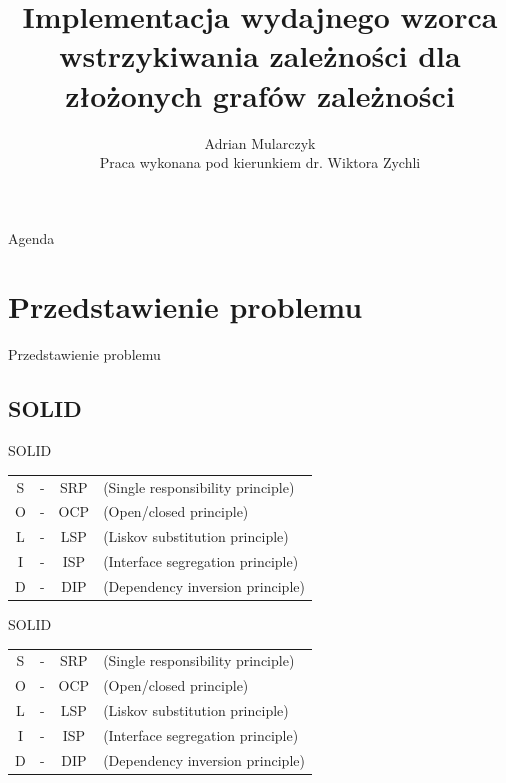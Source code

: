 \documentclass{beamer}
\title[]
{Implementacja wydajnego wzorca wstrzykiwania zależności dla złożonych grafów zależności}
\author[Adrian Mularczyk]{Adrian Mularczyk \\[10pt]{\footnotesize Praca wykonana pod kierunkiem dr. Wiktora Zychli}}
\institute[Uniwersytet Wrocławski]
{
Uniwersytet Wrocławski\\
Wydział Matematyki i Informatyki\\
Kierunek: Informatyka
}
\date{}
\begin{document}
\begin{frame}
  \titlepage 
\end{frame}

\begin{frame}{Agenda}
  \tableofcontents
\end{frame}

\section{Przedstawienie problemu}

\begin{frame}{}
\begin{center}
\huge{Przedstawienie problemu}
\end{center}
\end{frame}

\subsection*{SOLID}

\begin{frame}{SOLID}
\begin{table}
	\begin{tabular}{ c c c l }
	S &-& SRP& (Single responsibility principle)\\
	O &-& OCP& (Open/closed principle)\\
	L &-& LSP& (Liskov substitution principle)\\
	I &-& ISP& (Interface segregation principle)\\
	D &-& DIP& (Dependency inversion principle)
	\end{tabular}
\end{table}
\end{frame}

\begin{frame}{SOLID}
\begin{table}
	\begin{tabular}{ c c c l }
\color{gray} S &\color{gray}-& \color{gray}SRP& \color{gray}(Single responsibility principle)\\
\color{gray} O &\color{gray}-& \color{gray}OCP& \color{gray}(Open/closed principle)\\
\color{gray}	L &\color{gray}-& \color{gray}LSP& \color{gray}(Liskov substitution principle)\\
\color{gray}	I &\color{gray}-& \color{gray}ISP& \color{gray}(Interface segregation principle)\\
	D &-& DIP& (Dependency inversion principle)
	\end{tabular}
\end{table}
\end{frame}
\end{document}
